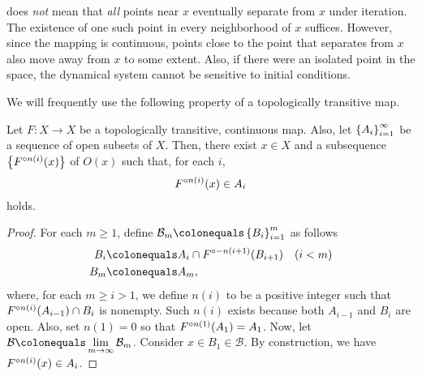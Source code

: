\documentclass[12pt,draft,twoside]{book}
\begin{document}
%
\sdic does \textit{not} mean that \textit{all} points near $x$ eventually separate from $x$ under iteration.
The existence of one such point in every neighborhood of $x$ suffices.
However, since the mapping is continuous, points close to the point that separates from $x$ also move away from $x$ to some extent.
Also, if there were an isolated point in the space, the dynamical system cannot be sensitive to initial conditions.

We will frequently use the following property of a topologically transitive map.
\begin{proposition}
  Let $F: X \to X$ be a topologically transitive, continuous map.
  Also, let $\left \{ A_i \right \}^{\infty}_{i=1}$ be a sequence of open subsets of $X$.
  Then, there exist $x \in X$ and a subsequence $\left \{ F^{\circ n(i)}(x) \right \}$ of $O(x)$ such that, for each $i$,
  \begin{equation*}
    F^{\circ n(i)}(x) \in A_i
  \end{equation*}
  holds.
  \label{prop:transitivity}
  \begin{proof}
    For each $m \geq 1$, define $\mathcal{B}_m \ceq \seq{B_i}{m}{i=1}$ as follows
    \begin{align*}
      B_i &\ceq A_{i} \cap \itr{F}{-n(i+1)} (B_{i+1}) \quad (i < m) \\
      B_m &\ceq A_m,
    \end{align*}
    where, for each $m \geq i > 1$, we define $n(i)$ to be a positive integer such that $F^{\circ n(i)}(A_{i-1}) \cap B_i$ is nonempty.
    Such $n(i)$ exists because both $A_{i-1}$ and $B_i$ are open.
    Also, set $n(1) = 0$ so that $F^{\circ n(1)}(A_1) = A_1$.
    Now, let $\mathcal{B} \ceq \lim\limits_{m \to \infty} \mathcal{B}_m$.
    Consider $x \in B_1 \in \mathcal{B}$.
    By construction, we have $F^{\circ n(i)}(x) \in A_i$.
  \end{proof}
\end{proposition}
\end{document}
